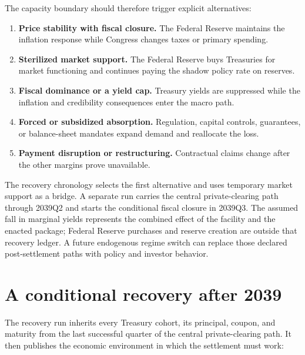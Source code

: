 \documentclass[11pt]{article}
\begin{document}
The capacity boundary should therefore trigger explicit alternatives:
\begin{enumerate}
\item \textbf{Price stability with fiscal closure.}  The Federal Reserve maintains the
inflation response while Congress changes taxes or primary spending.
\item \textbf{Sterilized market support.}  The Federal Reserve buys Treasuries for market
functioning and continues paying the shadow policy rate on reserves.
\item \textbf{Fiscal dominance or a yield cap.}  Treasury yields are suppressed while the
inflation and credibility consequences enter the macro path.
\item \textbf{Forced or subsidized absorption.}  Regulation, capital controls, guarantees,
or balance-sheet mandates expand demand and reallocate the loss.
\item \textbf{Payment disruption or restructuring.}  Contractual claims change after the
other margins prove unavailable.
\end{enumerate}
The recovery chronology selects the first alternative and uses temporary market support as
a bridge.  A separate run carries the central private-clearing path through 2039Q2 and starts
the conditional fiscal closure in 2039Q3.  The assumed fall in marginal yields represents
the combined effect of the facility and the enacted package; Federal Reserve purchases and
reserve creation are outside that recovery ledger.  A future endogenous regime switch can
replace those declared post-settlement paths with policy and investor behavior.

\section{A conditional recovery after 2039}

The recovery run inherits every Treasury cohort, its principal, coupon, and maturity from
the last successful quarter of the central private-clearing path.  It then publishes the
economic environment in which the settlement must work:
\end{document}
